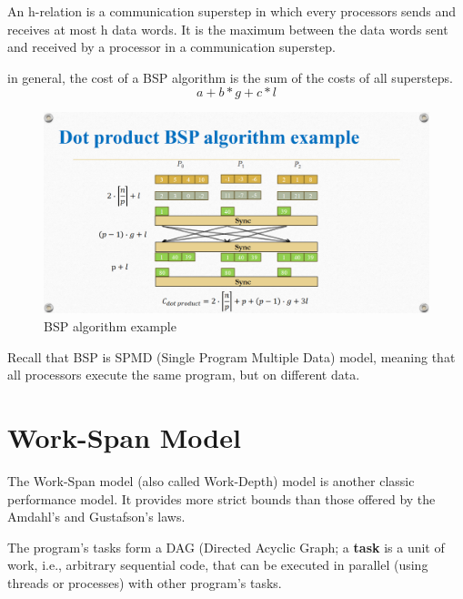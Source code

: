 An h-relation is a communication superstep in which every processors sends and receives at most h
data words.
It is the maximum between the data words sent and received by a processor in a communication superstep.



in general, the cost of a BSP algorithm is the sum of the costs of all supersteps.
\begin{equation}
   a + b * g + c * l
\end{equation}

\begin{figure}[htbp]
   \centering
   \includegraphics{images/07/bsp_example.png}
   \caption{BSP algorithm example}
   \label{fig:07/bsp_example}
\end{figure}

Recall that BSP is SPMD (Single Program Multiple Data) model, meaning that all processors execute the same program, but on different data.

\section{Work-Span Model}
The Work-Span model (also called Work-Depth) model is another classic performance model. It provides more strict bounds than those offered by the Amdahl's and Gustafson's laws.

The program's tasks form a DAG (Directed Acyclic Graph; a \textbf{task} is a unit of work, i.e., arbitrary sequential code, that can be executed in parallel (using threads or processes) with other program's tasks.

